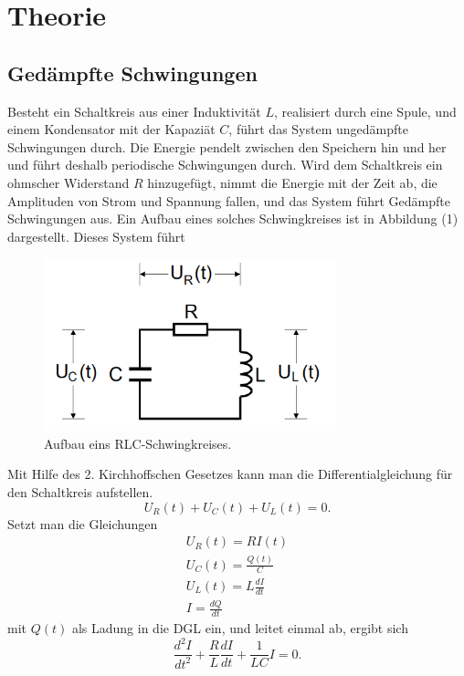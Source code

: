 \section{Theorie}
\label{sec:Theorie}

\subsection {Gedämpfte Schwingungen}
Besteht ein Schaltkreis aus einer Induktivität $L$, realisiert durch eine Spule, und einem Kondensator mit der Kapaziät $C$, führt das System
ungedämpfte Schwingungen durch. Die Energie pendelt zwischen den Speichern hin und her und führt deshalb periodische Schwingungen durch.
Wird dem Schaltkreis ein ohmscher Widerstand $R$ hinzugefügt, nimmt die Energie mit der Zeit ab, die Amplituden von Strom und Spannung fallen,
und das System führt Gedämpfte Schwingungen aus. Ein Aufbau eines solches Schwingkreises ist in Abbildung (1) dargestellt. Dieses System führt
\begin{figure}[H]
  \centering
  \includegraphics[height=5cm]{RLC.png}
  \caption{Aufbau eins RLC-Schwingkreises. \cite[S.1]{kent}}
\end{figure}
Mit Hilfe des 2. Kirchhoffschen Gesetzes kann man die Differentialgleichung für den Schaltkreis aufstellen.
\begin{equation}
U_R (t) + U_C (t) + U_L (t) = 0 .
\end{equation}
Setzt man die Gleichungen
\begin{align}
U_R (t) = R I(t)  \\
U_C (t) = \frac{Q(t)}{C}  \\
U_L (t) = L \frac{dI}{dt} \\
I = \frac{dQ}{dt}
\end{align}
mit $Q(t)$ als Ladung in die DGL ein, und leitet einmal ab, ergibt sich 
\begin{equation}
\frac{d^2I}{dt^2} + \frac{R}{L}\frac{dI}{dt} + \frac{1}{LC}I = 0 .
\end{equation}

